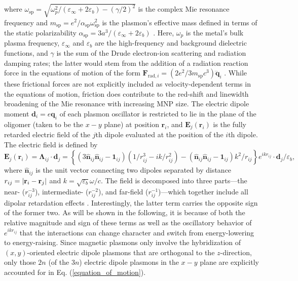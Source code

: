 \documentclass [11pt, proquest] {uwthesis}[2016/11/22]
\begin{document}
where $\omega_{\textrm{sp}}=\sqrt{\omega_{p}^2/(\varepsilon_\infty+2\varepsilon_b)-(\gamma/2)^2}$ is the complex Mie resonance frequency and $m_{\textrm{sp}} = e^2/\alpha_{\textrm{sp}}\omega_{\textrm{sp}}^2$ is the plasmon's effective mass defined in terms of the static polarizability $\alpha_{\textrm{sp}} = 3a^3/(\varepsilon_{\infty} + 2\varepsilon_b)$ \cite{Cherqui2014}. Here, $\omega_p$ is the metal's bulk plasma frequency, $\varepsilon_{\infty}$ and $\varepsilon_b$ are the high-frequency and background dielectric functions, and $\gamma$ is the sum of the Drude electron-ion scattering and radiation damping rates; the latter would stem from the addition of a radiation reaction force in the equations of motion of the form $\textbf{F}_{\textrm{rad},i}=(2e^2/3m_{\textrm{sp}}c^3)\dddot{\textbf{q}}_i$ \cite{Draine1993}. While these frictional forces are not explicitly included as velocity-dependent terms in the equations of motion, friction does contribute to the red-shift and linewidth broadening of the Mie resonance with increasing MNP size. The electric dipole moment $\textbf{d}_i = e\textbf{q}_i$ of each plasmon oscillator is restricted to lie in the plane of the oligomer (taken to be the $x-y$ plane) at position $\textbf{r}_i$, and $\textbf{E}_j(\textbf{r}_i)$ is the fully retarded electric field of the $j$th dipole evaluated at the position of the $i$th dipole. The electric field is defined by $\textbf{E}_j(\textbf{r}_i) = \boldsymbol{\Lambda}_{ij}\cdot\textbf{d}_j= \left\{\left(3\hat{\textbf{n}}_{ij}\hat{\textbf{n}}_{ij} - \textbf{1}_{ij}\right)\left({1}/{r_{ij}^3} - {ik}/{r_{ij}^2}\right) - \left(\hat{\textbf{n}}_{ij}\hat{\textbf{n}}_{ij} - \textbf{1}_{ij}\right)k^2/r_{ij}\right\}e^{ikr_{ij}}\cdot\textbf{d}_j/\varepsilon_b,$ where $\hat{\textbf{n}}_{ij}$ is the unit vector connecting two dipoles separated by distance $r_{ij}=|{\bf r}_i-{\bf r}_j|$ and $k=\sqrt{\varepsilon_b}\omega/c.$ The field is decomposed into three parts---the near- ($r_{ij}^{-3}$), intermediate- ($r_{ij}^{-2}$), and far-field ($r_{ij}^{-1}$)---which together include all dipolar retardation effects \cite{Purcell1973}. Interestingly, the latter term carries the opposite sign of the former two. As will be shown in the following, it is because of both the relative magnitude and sign of these terms as well as the oscillatory behavior of $e^{ikr_{ij}}$ that the interactions can change character and switch from energy-lowering to energy-raising. Since magnetic plasmons only involve the hybridization of $(x,y)$-oriented electric dipole plasmons that are orthogonal to the $z$-direction, only those $2n$ (of the $3n$) electric dipole plasmons in the $x-y$ plane are explicitly accounted for in Eq. (\ref{equation_of_motion}).
\end{document}

